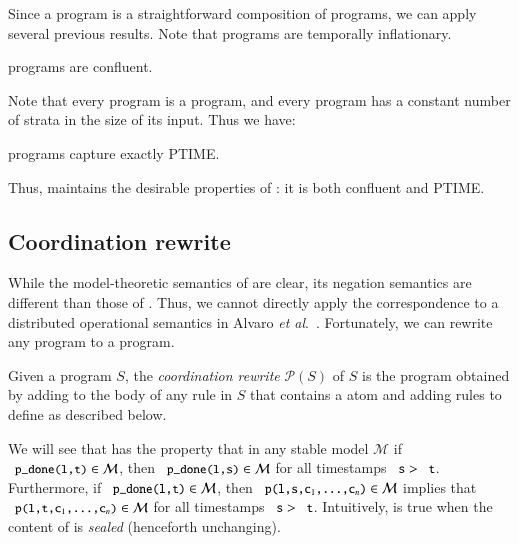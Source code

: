 Since a \plang program is a straightforward composition of \slang programs, we can apply several previous results.  Note that \plang programs are temporally inflationary.

\begin{corollary}
\label{cor:plang-confluent}
\plang programs are confluent.
\end{corollary}

Note that every \slang program is a \plang program, and every \plang program has a constant number of strata in the size of its input.  Thus we have:

\begin{corollary}
\label{cor:plang-ptime}
\plang programs capture exactly PTIME.
\end{corollary}

Thus, \plang maintains the desirable properties of \slang: it is both confluent and PTIME.

\subsection{Coordination rewrite}
\label{sec:coordination}

While the model-theoretic semantics of \plang are clear, its negation
semantics are different than those of \lang.  Thus, we cannot directly apply the
correspondence to a distributed operational semantics in Alvaro \emph{et
  al}.~\cite{ameloot-operational}.  Fortunately, we can rewrite any \plang
program to a \lang program.

Given a \plang program $S$, the {\em coordination rewrite} $\mathcal{P}(S)$ of $S$ is
the \lang program obtained by adding  to the body of any rule
in $S$ that contains a  atom and adding rules to define
 as described below.

We will see that  has the
property that in any stable model $\mathcal{M}$ if $\dedalus{p_done(l,t)} \in
\mathcal{M}$, then $\dedalus{p_done(l,s)} \in \mathcal{M}$ for all timestamps
$\dedalus{s} > \dedalus{t}$.  Furthermore, if $\dedalus{p_done(l,t)} \in
\mathcal{M}$, then $\dedalus{p(l,s,c\sub{1},\ldots,c\sub{n})} \in \mathcal{M}$
implies that $\dedalus{p(l,t,c\sub{1},\ldots,c\sub{n})} \in \mathcal{M}$ for all
timestamps $\dedalus{s} > \dedalus{t}$.  Intuitively,  is true
when the content of  is {\em sealed} (henceforth unchanging).


